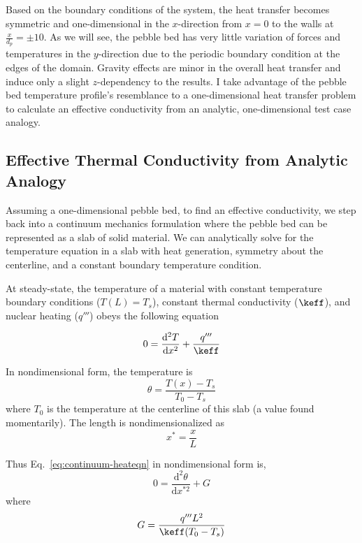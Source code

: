 Based on the boundary conditions of the system, the heat transfer becomes symmetric and one-dimensional in the $x$-direction from $x=0$ to the walls at $\frac{x}{d_p} = \pm 10$. As we will see, the pebble bed has very little variation of forces and temperatures in the $y$-direction due to the periodic boundary condition at the edges of the domain. Gravity effects are minor in the overall heat transfer and induce only a slight $z$-dependency to the results. I take advantage of the pebble bed temperature profile's resemblance to a one-dimensional heat transfer problem to calculate an effective conductivity from an analytic, one-dimensional test case analogy.





\subsection{Effective Thermal Conductivity from Analytic Analogy}\label{sec:keff-analogy}
Assuming a one-dimensional pebble bed, to find an effective conductivity, we step back into a continuum mechanics formulation where the pebble bed can be represented as a slab of solid material. We can analytically solve for the temperature equation in a slab with heat generation, symmetry about the centerline, and a constant boundary temperature condition.

At steady-state, the temperature of a material with constant temperature boundary conditions ($T(L) = T_s$), constant thermal conductivity ($\keff$), and nuclear heating ($q'''$) obeys the following equation

\begin{equation}\label{eq:continuum-heateqn}
	0 = \frac{\mathrm{d}^2T}{\mathrm{d}x^2} + \frac{q'''}{\keff}
\end{equation}

In nondimensional form, the temperature is
\begin{equation}
	\theta = \frac{T(x) - T_s}{T_0 - T_s}
\end{equation}
where $T_0$ is the temperature at the centerline of this slab (a value found momentarily). The length is nondimensionalized as
\begin{equation}
	x^* = \frac{x}{L}
\end{equation}

Thus Eq.~\ref{eq:continuum-heateqn} in nondimensional form is,
\begin{equation}\label{eq:continuum-heateqn-nondim}
	0 = \frac{\mathrm{d}^2\theta}{\mathrm{d}x^{*2}} + G
\end{equation}
where
\begin{equation}
	G = \frac{q'''L^2}{\keff(T_0 - T_s)}
\end{equation}

